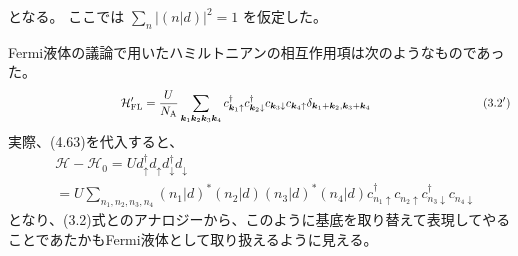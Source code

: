 \documentclass[a4j]{jarticle}
\begin{document}
となる。
ここでは
$\displaystyle
	\sum_{n}
	\big|
	( n | d )
	\big|^{2}
	=1
$
を仮定した。


Fermi液体の議論で用いたハミルトニアンの相互作用項は次のようなものであった。
\begin{align}
	\hspace{33.5mm}
	\mathcal{H}'_{\rm FL}
	=
	\frac{U}{N_{\rm A}}
	\sum_{\bm{k}_{1} \bm{k}_{2} \bm{k}_{3} \bm{k}_{4}}
	c_{\bm{k}_{1} \uparrow}^{\dagger}
	c_{\bm{k}_{2} \downarrow}^{\dagger}
	c_{\bm{k}_{3} \downarrow}
	c_{\bm{k}_{4} \uparrow}
	\delta_{\bm{k}_{1}+\bm{k}_{2} , \bm{k}_{3}+\bm{k}_{4}}
	\nonumber
	\hspace{33.5mm}
	(3.2')
\end{align}
実際、(4.63)を代入すると、
\begin{align}
	 &
	\mathcal{H} - \mathcal{H}_{0}
	=
	U
	d_{\uparrow}^{\dagger}
	d_{\uparrow}
	d_{\downarrow}^{\dagger}
	d_{\downarrow}
	\nonumber \\
	 & =
	U
	\sum_{n_{1},n_{2},n_{3},n_{4}}
	(n_{1} | d)^{*}
	(n_{2} | d)
	(n_{3} | d)^{*}
	(n_{4} | d)
	c_{n_{1} \uparrow}^{\dagger}
	c_{n_{2} \uparrow}
	c_{n_{3} \downarrow}^{\dagger}
	c_{n_{4} \downarrow}
\end{align}
となり、(3.2)式とのアナロジーから、このように基底を取り替えて表現してやることであたかもFermi液体として取り扱えるように見える。

${}$
\end{document}
